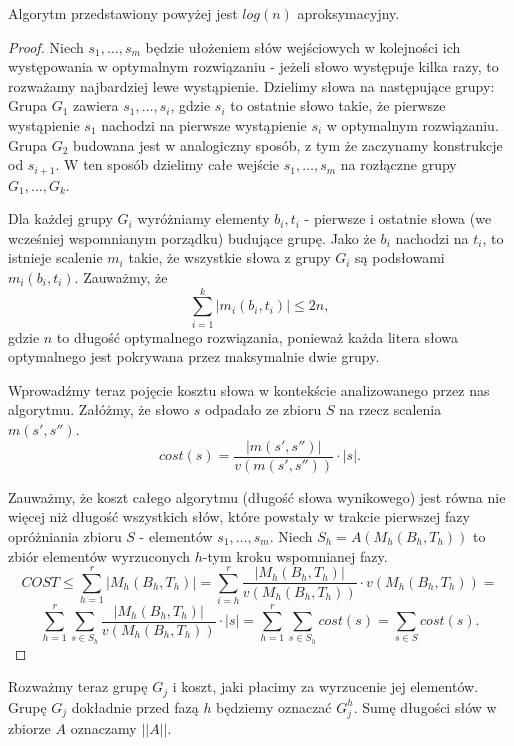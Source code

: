 \begin{theorem}{}{}
Algorytm przedstawiony powyżej jest $log(n)$ aproksymacyjny.
\end{theorem}
\begin{proof}
Niech $s_1, \dots, s_m$ będzie ułożeniem słów wejściowych w kolejności ich występowania w optymalnym rozwiązaniu - jeżeli słowo występuje kilka razy, to rozważamy najbardziej lewe wystąpienie. Dzielimy słowa na następujące grupy:
\newline
Grupa $G_1$ zawiera $s_1, \dots, s_i$, gdzie $s_i$ to ostatnie słowo takie, że pierwsze wystąpienie $s_1$ nachodzi na pierwsze wystąpienie $s_i$ w optymalnym rozwiązaniu.
\newline
Grupa $G_2$ budowana jest w analogiczny sposób, z tym że zaczynamy konstrukcje od $s_{i+1}$. W ten sposób dzielimy całe wejście $s_1, \dots, s_m$ na rozłączne grupy $G_1, \dots, G_k$.

Dla każdej grupy $G_i$ wyróżniamy elementy $b_i, t_i$ - pierwsze i ostatnie słowa (we wcześniej wspomnianym porządku) budujące grupę. Jako że $b_i$ nachodzi na $t_i$, to istnieje scalenie $m_i$ takie, że wszystkie słowa z grupy $G_i$ są podsłowami $m_i(b_i, t_i)$.
Zauważmy, że 
$$\sum_{i=1}^{k} |m_i(b_i, t_i)| \leq 2n,$$
gdzie $n$ to długość optymalnego rozwiązania, ponieważ każda litera słowa optymalnego jest pokrywana przez maksymalnie dwie grupy.

Wprowadźmy teraz pojęcie kosztu słowa w kontekście analizowanego przez nas algorytmu. Załóżmy, że słowo $s$ odpadało ze zbioru $S$ na rzecz scalenia $m(s', s'')$. 
$$cost(s) = \frac{|m(s', s'')|}{v(m(s', s''))} \cdot |s|.$$

Zauważmy, że koszt całego algorytmu (długość słowa wynikowego) jest równa nie więcej niż długość wszystkich słów, które powstały w trakcie pierwszej fazy opróżniania zbioru $S$ - elementów $s_1, \dots, s_m$. Niech $S_h = A(M_h(B_h, T_h))$ to zbiór elementów wyrzuconych $h$-tym kroku wspomnianej fazy. 
$$COST \leq \sum_{h=1}^{r} |M_h(B_h, T_h)| = \sum_{i=h}^{r} \frac{|M_h(B_h, T_h)|}{v(M_h(B_h, T_h))} \cdot v(M_h(B_h, T_h))= $$
$$\sum_{h=1}^{r} \sum_{s \in S_h} \frac{|M_h(B_h, T_h)|}{v(M_h(B_h, T_h))} \cdot |s| = \sum_{h=1}^{r} \sum_{s \in S_h} cost(s) = \sum_{s \in S} cost(s).$$
\end{proof}

Rozważmy teraz grupę $G_j$ i koszt, jaki płacimy za wyrzucenie jej elementów. Grupę $G_j$ dokładnie przed fazą $h$ będziemy oznaczać $G_j^{h}$.
Sumę długości słów w zbiorze $A$ oznaczamy $||A||$.
 

